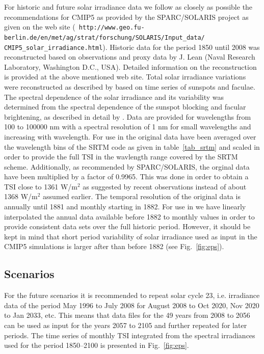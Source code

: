 \begin{sloppy}
For historic and future solar irradiance data we follow as closely as
possible the recommendations 
for CMIP5 as provided by the SPARC/SOLARIS project as  given on the
web site ({\tt
  http://www.geo.fu-berlin.de/en/met/ag/strat/forschung/SOLARIS/Input\_data/}
\\ 
{\tt CMIP5\_solar\_irradiance.html}).
Historic data for the period 1850 until 2008 was reconstructed based
on observations and proxy data by J. Lean (Naval Research Laboratory,
Washington D.C., USA). Detailed information on the reconstruction is
provided at the above mentioned web site.  
Total solar irradiance variations were reconstructed as described by
\citet{froehlich_04} based on time series of sunspots and faculae. 
The spectral dependence of the solar irradiance and its variability
was determined from the 
spectral dependence of the sunspot blocking and 
facular brightening, as described in detail by \citet{lean_00}. 
Data are provided for wavelengths from 100 to 100000 nm with a
spectral resolution of 1 nm for small  
wavelengths and increasing with wavelength. For use in \echam{} the
original data have been averaged over the wavelength bins of  
the SRTM code as given in table~\ref{tab_srtm} and scaled in order to
provide the full TSI in the wavlength range covered by the SRTM
scheme. 
Additionally, as recommended by SPARC/SOLARIS, the orginal data have
been multiplied by 
a factor of 0.9965. This was done in order to obtain a TSI close 
to 1361 W/m$^2$ as suggested by recent observations instead of about
1368 W/m$^2$ assumed earlier. 
The temporal resolution of the original data is annually until 1881
and monthly starting in 1882. 
For use in \echam{} we have linearly interpolated the annual data
available before 1882 to monthly values in order to 
provide consistent data sets over the full historic period. However,
it should be kept in mind that short period variability of solar
irradiance 
used as input in the CMIP5 simulations is larger after than before
1882 (see Fig.~\ref{fig:eps}). 
\end{sloppy}

\subsection{Scenarios}
For the future scenarios it is recommended to repeat solar cycle 23, i.e. irradiance data of the period 
May 1996 to July 2008 for August 2008 to Oct 2020, Nov 2020 to Jan 2033, etc. 
This means that data files for the 49 years from 2008 to 2056 can be used as input for the years 2057 to 2105 and 
further repeated for later periods. The time series of monthly TSI integrated from the spectral irradiances used for
the period 1850--2100 is presented in Fig.~\ref{fig:eps}.


